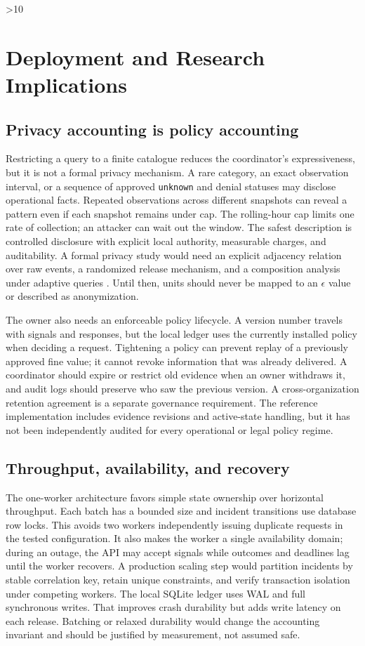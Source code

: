 \documentclass[conference,letterpaper]{IEEEtran}
\begin{document}
\ifnum\PaperLength>10
\section{Deployment and Research Implications}
\subsection{Privacy accounting is policy accounting}
Restricting a query to a finite catalogue reduces the coordinator's expressiveness, but it is not a formal privacy mechanism. A rare category, an exact observation interval, or a sequence of approved \texttt{unknown} and denial statuses may disclose operational facts. Repeated observations across different snapshots can reveal a pattern even if each snapshot remains under cap. The rolling-hour cap limits one rate of collection; an attacker can wait out the window. The safest description is controlled disclosure with explicit local authority, measurable charges, and auditability. A formal privacy study would need an explicit adjacency relation over raw events, a randomized release mechanism, and a composition analysis under adaptive queries \cite{dwork}. Until then, units should never be mapped to an $\epsilon$ value or described as anonymization.

The owner also needs an enforceable policy lifecycle. A version number travels with signals and responses, but the local ledger uses the currently installed policy when deciding a request. Tightening a policy can prevent replay of a previously approved fine value; it cannot revoke information that was already delivered. A coordinator should expire or restrict old evidence when an owner withdraws it, and audit logs should preserve who saw the previous version. A cross-organization retention agreement is a separate governance requirement. The reference implementation includes evidence revisions and active-state handling, but it has not been independently audited for every operational or legal policy regime.

\subsection{Throughput, availability, and recovery}
The one-worker architecture favors simple state ownership over horizontal throughput. Each batch has a bounded size and incident transitions use database row locks. This avoids two workers independently issuing duplicate requests in the tested configuration. It also makes the worker a single availability domain; during an outage, the API may accept signals while outcomes and deadlines lag until the worker recovers. A production scaling step would partition incidents by stable correlation key, retain unique constraints, and verify transaction isolation under competing workers. The local SQLite ledger uses WAL and full synchronous writes. That improves crash durability but adds write latency on each release. Batching or relaxed durability would change the accounting invariant and should be justified by measurement, not assumed safe.
\end{document}
